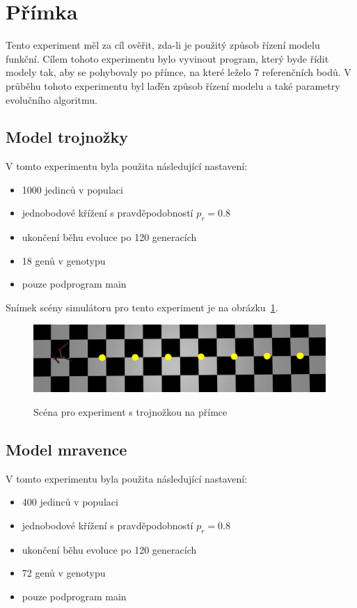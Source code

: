 \section{Přímka}
Tento experiment měl za cíl ověřit, zda-li je použitý způsob řízení modelu funkční.
Cílem tohoto experimentu bylo vyvinout program, který byde řídit modely tak, aby se pohybovaly po přímce, na které leželo 7 referenčních bodů.
V průběhu tohoto experimentu byl laďěn způsob řízení modelu a také parametry evolučního algoritmu.

\subsection{Model trojnožky}
V tomto experimentu byla použita následující nastavení:
\begin{itemize}
    \item 1000 jedinců v populaci
    \item jednobodové křížení s pravděpodobností $p_r = 0.8$
    \item ukončení běhu evoluce po 120 generacích
    \item 18 genů v genotypu
    \item pouze podprogram main
\end{itemize}

Snímek scény simulátoru pro tento experiment je na obrázku~\ref{fig:trojnozka_primka_zhora}.
\begin{figure}[h]
    \centering
    {\includegraphics[width=30em]{obrazky/trojnozka_primka_zhora.png}}
    \caption{
    Scéna pro experiment s trojnožkou na přímce
    }
    \label{fig:trojnozka_primka_zhora}
\end{figure}



\subsection{Model mravence}
V tomto experimentu byla použita následující nastavení:
\begin{itemize}
    \item 400 jedinců v populaci
    \item jednobodové křížení s pravděpodobností $p_r = 0.8$
    \item ukončení běhu evoluce po 120 generacích
    \item 72 genů v genotypu
    \item pouze podprogram main
\end{itemize}


